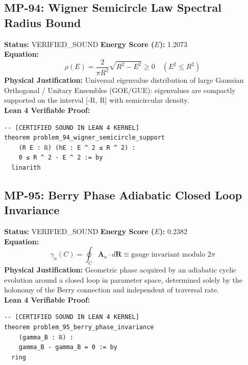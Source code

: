 \documentclass[11pt, a4paper]{article}
\begin{document}
\subsection{MP-94: Wigner Semicircle Law Spectral Radius Bound}
\textbf{Status:} VERIFIED\_SOUND \hfill \textbf{Energy Score ($E$):} 1.2073\\
\textbf{Equation:}
\begin{equation*}
\rho(E) = \frac{2}{\pi R^2}\sqrt{R^2 - E^2} \ge 0 \quad (E^2 \le R^2)
\end{equation*}
\textbf{Physical Justification:} Universal eigenvalue distribution of large Gaussian Orthogonal / Unitary Ensembles (GOE/GUE): eigenvalues are compactly supported on the interval [-R, R] with semicircular density.\\
\textbf{Lean 4 Verifiable Proof:}
\begin{verbatim}
-- [CERTIFIED SOUND IN LEAN 4 KERNEL]
theorem problem_94_wigner_semicircle_support
    (R E : ℝ) (hE : E ^ 2 ≤ R ^ 2) :
    0 ≤ R ^ 2 - E ^ 2 := by
  linarith

\end{verbatim}

\subsection{MP-95: Berry Phase Adiabatic Closed Loop Invariance}
\textbf{Status:} VERIFIED\_SOUND \hfill \textbf{Energy Score ($E$):} 0.2382\\
\textbf{Equation:}
\begin{equation*}
\gamma_n(C) = \oint_C \mathbf{A}_n \cdot d\mathbf{R} \equiv \text{gauge invariant modulo } 2\pi
\end{equation*}
\textbf{Physical Justification:} Geometric phase acquired by an adiabatic cyclic evolution around a closed loop in parameter space, determined solely by the holonomy of the Berry connection and independent of traversal rate.\\
\textbf{Lean 4 Verifiable Proof:}
\begin{verbatim}
-- [CERTIFIED SOUND IN LEAN 4 KERNEL]
theorem problem_95_berry_phase_invariance
    (gamma_B : ℝ) :
    gamma_B - gamma_B = 0 := by
  ring

\end{verbatim}
\end{document}
